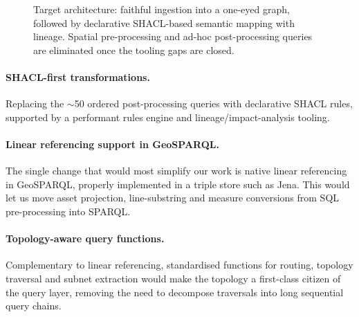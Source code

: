 \documentclass[twocolumn]{ceurart}
\begin{document}
\begin{figure}[t]
  \centering
  \caption{Target architecture: faithful ingestion into a one-eyed graph,
    followed by declarative SHACL-based semantic mapping with lineage. Spatial
    pre-processing and ad-hoc post-processing queries are eliminated once the
    tooling gaps are closed.}
  \label{fig:future}
\end{figure}

\paragraph{SHACL-first transformations.} Replacing the $\sim$50 ordered
post-processing queries with declarative SHACL rules, supported by a performant
rules engine and lineage/impact-analysis tooling.

\paragraph{Linear referencing support in GeoSPARQL.} The single change that would
most simplify our work is native linear referencing~\cite{lrs} in GeoSPARQL,
properly implemented in a triple store such as Jena. This would let us move asset
projection, line-substring and measure conversions from SQL pre-processing into
SPARQL.

\paragraph{Topology-aware query functions.} Complementary to linear referencing,
standardised functions for routing, topology traversal and subnet extraction
would make the topology a first-class citizen of the query layer, removing the
need to decompose traversals into long sequential query chains.
\end{document}

